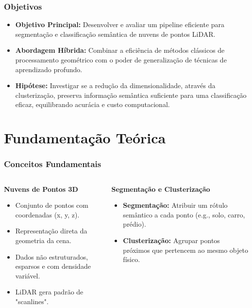 \documentclass[aspectratio=169,t,xcolor=table]{beamer}
\begin{document}
\begin{frame}
    \frametitle{Objetivos}
    \begin{itemize}
        \item \textbf{Objetivo Principal:} Desenvolver e avaliar um pipeline eficiente para segmentação e classificação semântica de nuvens de pontos LiDAR.
        \item \textbf{Abordagem Híbrida:} Combinar a eficiência de métodos clássicos de processamento geométrico com o poder de generalização de técnicas de aprendizado profundo.
        \item \textbf{Hipótese:} Investigar se a redução da dimensionalidade, através da clusterização, preserva informação semântica suficiente para uma classificação eficaz, equilibrando acurácia e custo computacional.
    \end{itemize}
\end{frame}

\section{Fundamentação Teórica}

\begin{frame}
    \frametitle{Conceitos Fundamentais}
    \begin{columns}[T]
       \begin{column}{.5\textwidth}
            \textbf{Nuvens de Pontos 3D}
            \begin{itemize}
                \item Conjunto de pontos com coordenadas (x, y, z).
                \item Representação direta da geometria da cena.
                \item Dados não estruturados, esparsos e com densidade variável.
                \item LiDAR gera padrão de "scanlines".
            \end{itemize}
        \end{column}
        \begin{column}{.5\textwidth}
            \textbf{Segmentação e Clusterização}
            \begin{itemize}
                \item \textbf{Segmentação:} Atribuir um rótulo semântico a cada ponto (e.g., solo, carro, prédio).
                \item \textbf{Clusterização:} Agrupar pontos próximos que pertencem ao mesmo objeto físico.
            \end{itemize}
        \end{column}
    \end{columns}
\end{frame}
\end{document}
